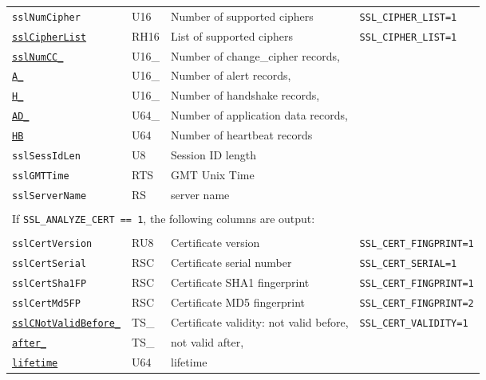 \documentclass[documentation]{subfiles}
\begin{document}
\begin{longtable}{llll}
    {\tt sslNumCipher} & U16 & Number of supported ciphers & {\small\tt SSL\_CIPHER\_LIST=1}\\
    {\tt \hyperref[sslCipher]{sslCipherList}} & RH16 & List of supported ciphers & {\small\tt SSL\_CIPHER\_LIST=1}\\

    {\tt \hyperref[sslNumRec]{sslNumCC\_}} & U16\_        & Number of change\_cipher records,\\
    {\tt \qquad\hyperref[sslNumRec]{A\_}}  & \qquad U16\_ & \qquad Number of alert records,\\
    {\tt \qquad\hyperref[sslNumRec]{H\_}}  & \qquad U16\_ & \qquad Number of handshake records,\\
    {\tt \qquad\hyperref[sslNumRec]{AD\_}} & \qquad U64\_ & \qquad Number of application data records,\\
    {\tt \qquad\hyperref[sslNumRec]{HB}}   & \qquad U64   & \qquad Number of heartbeat records\\

    {\tt sslSessIdLen}  & U8  & Session ID length\\
    {\tt sslGMTTime}    & RTS & GMT Unix Time\\
    {\tt sslServerName} & RS  & server name\\\\

    \multicolumn{4}{l}{If {\tt SSL\_ANALYZE\_CERT == 1}, the following columns are output:}\\\\

    {\tt sslCertVersion} & RU8 & Certificate version          & {\small\tt SSL\_CERT\_FINGPRINT=1}\\
    {\tt sslCertSerial}  & RSC & Certificate serial number    & {\small\tt SSL\_CERT\_SERIAL=1}\\
    {\tt sslCertSha1FP}  & RSC & Certificate SHA1 fingerprint & {\small\tt SSL\_CERT\_FINGPRINT=1}\\
    {\tt sslCertMd5FP}   & RSC & Certificate MD5 fingerprint  & {\small\tt SSL\_CERT\_FINGPRINT=2}\\

    {\tt\hyperref[sslValidity]{sslCNotValidBefore\_}} & TS\_        & Certificate validity: not valid before, & {\small\tt SSL\_CERT\_VALIDITY=1}\\
    {\tt\qquad\hyperref[sslValidity]{after\_}}        & \qquad TS\_ & \qquad not valid after, & \\
    {\tt\qquad\hyperref[sslValidity]{lifetime}}       & \qquad U64  & \qquad lifetime         & \\


\end{longtable}
\end{document}

